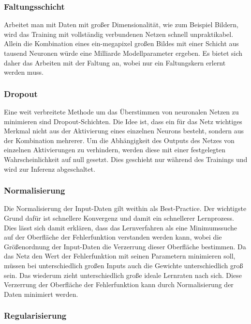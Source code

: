 \subsubsection{Faltungsschicht}

Arbeitet man mit Daten mit großer Dimensionalität, wie zum Beispiel Bildern, wird das Training mit vollständig verbundenen Netzen schnell unpraktikabel. Allein die Kombination eines ein-megapixel großen Bildes mit einer Schicht aus tausend Neuronen würde eine Milliarde Modellparameter ergeben.
Es bietet sich daher das Arbeiten mit der Faltung an, wobei nur ein Faltungskern erlernt werden muss.

\subsubsection{Dropout}

Eine weit verbreitete Methode um das Überstimmen von neuronalen Netzen zu minimieren sind Dropout-Schichten. Die Idee ist, dass ein für das Netz wichtiges Merkmal nicht aus der Aktivierung eines einzelnen Neurons besteht, sondern aus der Kombination mehrerer.
Um die Abhängigkeit des Outputs des Netzes von einzelnen Aktivierungen zu verhindern, werden diese mit einer festgelegten Wahrscheinlichkeit auf null gesetzt. Dies geschieht nur während des Trainings und wird zur Inferenz abgeschaltet.

\subsubsection{Normalisierung}

Die Normalisierung der Input-Daten gilt weithin als Best-Practice. Der wichtigste Grund dafür ist schnellere Konvergenz und damit ein schnellerer Lernprozess.
Dies lässt sich damit erklären, dass das Lernverfahren als eine Minimumssuche auf der Oberfläche der Fehlerfunktion verstanden werden kann, wobei die Größenordnung der Input-Daten die Verzerrung dieser Oberfläche bestimmen. Da das Netz den Wert der Fehlerfunktion mit seinen Parametern minimieren soll, müssen bei unterschiedlich großen Inputs auch die Gewichte unterschiedlich groß sein. Das wiederum zieht unterschiedlich große ideale Lernraten nach sich. Diese Verzerrung der Oberfläche der Fehlerfunktion kann durch Normalisierung der Daten minimiert werden.

\subsubsection{Regularisierung}

